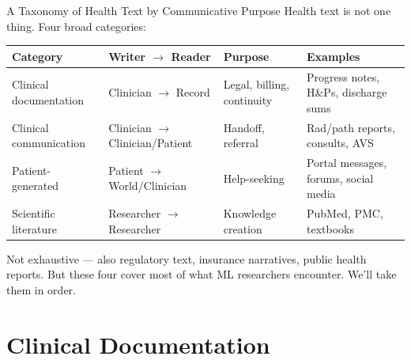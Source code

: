 \documentclass[aspectratio=169,11pt]{beamer}
\begin{document}
\begin{frame}{A Taxonomy of Health Text by Communicative Purpose}
Health text is not one thing. Four broad categories:

\vspace{0.15em}
\begin{center}
\scriptsize
\renewcommand{\arraystretch}{1.05}
\begin{tabular}{llp{2.3cm}p{3.0cm}}
\toprule
\textbf{Category} & \textbf{Writer $\to$ Reader} & \textbf{Purpose} & \textbf{Examples} \\
\midrule
Clinical documentation & Clinician $\to$ Record & Legal, billing, continuity & Progress notes, H\&Ps, discharge sums \\
Clinical communication & Clinician $\to$ Clinician/Patient & Handoff, referral & Rad/path reports, consults, AVS \\
Patient-generated & Patient $\to$ World/Clinician & Help-seeking & Portal messages, forums, social media \\
Scientific literature & Researcher $\to$ Researcher & Knowledge creation & PubMed, PMC, textbooks \\
\bottomrule
\end{tabular}
\end{center}

\pause
\vspace{0.15em}
{\footnotesize Not exhaustive --- also regulatory text, insurance narratives, public health reports. But these four cover most of what ML researchers encounter. We'll take them in order.}
\end{frame}

\section{Clinical Documentation}
\end{document}
